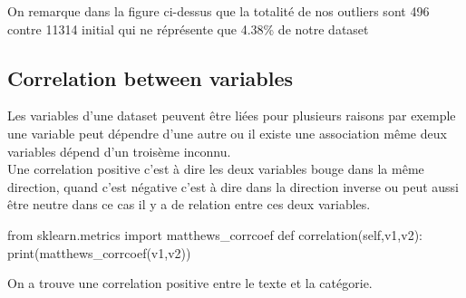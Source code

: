 \documentclass[english,a4paper,11pt,oneside]{article}
\begin{document}
{{			On remarque dans la figure ci-dessus que la totalité de nos outliers sont 496 contre 11314 initial qui ne réprésente que 4.38\% de notre dataset  
			
		}
		\subsection{Correlation between variables}{
			Les variables d'une dataset peuvent être liées pour plusieurs raisons par exemple une variable peut dépendre d'une autre ou il existe une association même deux variables dépend d'un troisème inconnu.\\
			Une correlation positive c'est à dire les deux variables bouge dans la même direction, quand c'est négative c'est à dire dans la direction inverse ou peut aussi être neutre dans ce cas il y a de relation entre ces deux variables.\\
			\begin{pythonn}
from sklearn.metrics import matthews\_corrcoef
def correlation(self,v1,v2):
	print(matthews_corrcoef(v1,v2))
			\end{pythonn}
			On a trouve une correlation positive entre le texte et la catégorie.
			
		}
	
			
	}
\end{document}
